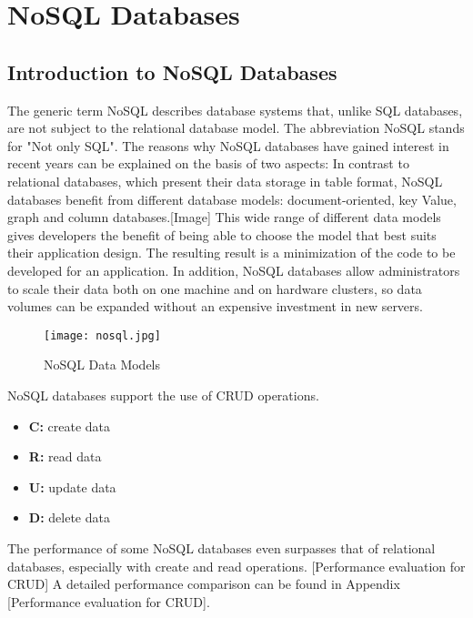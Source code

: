 \section{NoSQL Databases}

\subsection{Introduction to NoSQL Databases}
The generic term NoSQL describes database systems that, unlike SQL databases, are not subject to the relational database model. The abbreviation NoSQL stands for "Not only SQL". The reasons why NoSQL databases have gained interest in recent years can be explained on the basis of two aspects: In contrast to relational databases, which present their data storage in table format, NoSQL databases benefit from different database models: document-oriented, key Value, graph and column databases.[Image] This wide range of different data models gives developers the benefit of being able to choose the model that best suits their application design. The resulting result is a minimization of the code to be developed for an application. In addition, NoSQL databases allow administrators to scale their data both on one machine and on hardware clusters, so data volumes can be expanded without an expensive investment in new servers.
\begin{figure}[H]
	\centering
	\texttt{[image: nosql.jpg]}
	\caption[NoSQL Data Models]{NoSQL Data Models}
\end{figure}

NoSQL databases support the use of CRUD operations.
\begin{itemize}
	\item \textbf{C:} create data
	\item \textbf{R:} read data
	\item \textbf{U:} update data
	\item \textbf{D:} delete data
\end{itemize}
The performance of some NoSQL databases even surpasses that of relational databases, especially with create and read operations. [Performance evaluation for CRUD] A detailed  performance comparison can be found in Appendix [Performance evaluation for CRUD].
